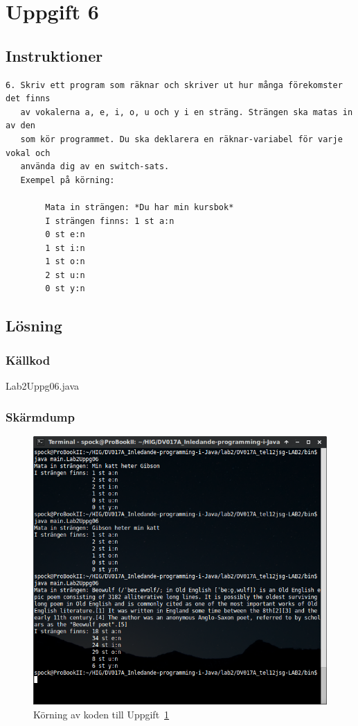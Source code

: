 \section{Uppgift 6}\label{sec:uppg06}

\subsection{Instruktioner}
\begin{verbatim}
6. Skriv ett program som räknar och skriver ut hur många förekomster det finns
   av vokalerna a, e, i, o, u och y i en sträng. Strängen ska matas in av den
   som kör programmet. Du ska deklarera en räknar-variabel för varje vokal och
   använda dig av en switch-sats.
   Exempel på körning:

        Mata in strängen: *Du har min kursbok*
        I strängen finns: 1 st a:n
        0 st e:n
        1 st i:n
        1 st o:n
        2 st u:n
        0 st y:n
\end{verbatim}


\subsection{Lösning}

\subsubsection{Källkod}
\caption{Lab2Uppg06.java}
\label{src:uppg06}


\subsubsection{Skärmdump}
\begin{figure}[htbp]
    \centering
        \includegraphics[width=\linewidth]{img/06.png}
    \caption{Körning av koden till Uppgift~\ref{sec:uppg06}}
    \label{fig:uppg06-screenshot}
\end{figure}

